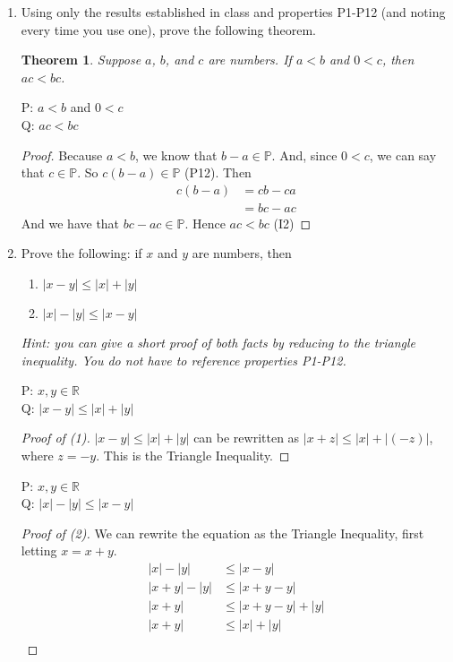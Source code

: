 \documentclass{article} %
\theoremstyle{plain}
\newtheorem*{theorem*}{Theorem}
\theoremstyle{case}
\begin{document}
\begin{enumerate}[label={\fbox{\textbf{Exercise \#\arabic* :}}}]
\begin{proof}
\end{proof} 

\newpage
\item Using only the results established in class and properties P1-P12 (and noting every time you use one), prove the following theorem. 

\begin{theorem*}
Suppose $a$, $b$, and $c$ are numbers. If $a<b$ and $0<c$, then $ac < bc$. 
\end{theorem*}

P: $a<b$ and $0<c$\\
Q: $ac < bc$

\begin{proof}
  Because $a < b$, we know that $b - a \in \mathbb{P}  $.  And,
  since $0 < c$, we can say that $c \in \mathbb{P}$.
  So $c(b-a) \in \mathbb{P}  $ (P12).  Then
    \begin{align}
      c(b-a) &= cb-ca \tag*{(P9)} \\
             &= bc -ac \tag*{(P8)}
    \end{align}
    And we have that $bc - ac \in \mathbb{P}$. Hence $ac < bc$ (I2)
\end{proof} 

\newpage
\item Prove the following: if $x$ and $y$ are numbers, then 
\begin{enumerate}[label=(\arabic*)]
\item $|x-y| \leq |x|+|y|$
\item $|x|-|y| \leq |x-y|$
\end{enumerate}
\textit{Hint: you can give a short proof of both facts by reducing to the
  triangle inequality.  You do not have to reference properties P1-P12.}

P: ${x, y} \in \mathbb{R}$\\
Q: $|x-y| \leq |x|+|y|$

\begin{proof}[Proof of (1)]
  $|x-y| \leq |x|+|y|$ can be rewritten as $|x+z| \leq |x|+|(-z)|$, where
  $z = -y$.  This is the Triangle Inequality.
\end{proof}

P: ${x, y} \in \mathbb{R}$\\
Q: $|x|-|y| \leq |x-y|$

\begin{proof}[Proof of (2)] We can rewrite the equation as the 
  Triangle Inequality, first letting $x = x + y$.
  \begin{align*}
    |x| - |y| &\leq |x-y| \\
    |x + y | - | y | &\leq |x + y - y| \\
    |x + y| &\leq |x + y - y | + |y| \\
    |x + y| &\leq |x | + |y| \\
  \end{align*}
\end{proof}


\end{enumerate}
\end{document}
